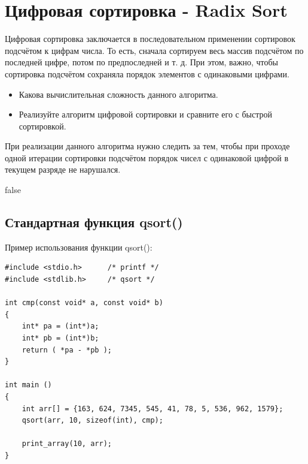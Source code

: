 \documentclass{article}
\begin{document}
\section*{Цифровая сортировка - Radix Sort}
Цифровая сортировка заключается в последовательном применении сортировок подсчётом к цифрам числа. То есть, сначала сортируем весь массив подсчётом по последней цифре, потом по предпоследней и т. д. При этом, важно, чтобы сортировка подсчётом сохраняла порядок элементов с одинаковыми цифрами.
\begin{itemize}
\item Какова вычислительная сложность данного алгоритма.
\item Реализуйте алгоритм цифровой сортировки и сравните его с быстрой сортировкой.
\end{itemize}
При реализации данного алгоритма нужно следить за тем, чтобы при проходе одной итерации сортировки подсчётом порядок чисел с одинаковой цифрой в текущем разряде не нарушался.
\newpage


\if false
\subsection*{Стандартная функция qsort()}

Пример использования функции qsort():
\begin{verbatim}
#include <stdio.h>      /* printf */
#include <stdlib.h>     /* qsort */

int cmp(const void* a, const void* b)
{
    int* pa = (int*)a;
    int* pb = (int*)b;
    return ( *pa - *pb );
}

int main ()
{
    int arr[] = {163, 624, 7345, 545, 41, 78, 5, 536, 962, 1579};
    qsort(arr, 10, sizeof(int), cmp);
   
    print_array(10, arr);
}
\end{verbatim}
\end{document}
